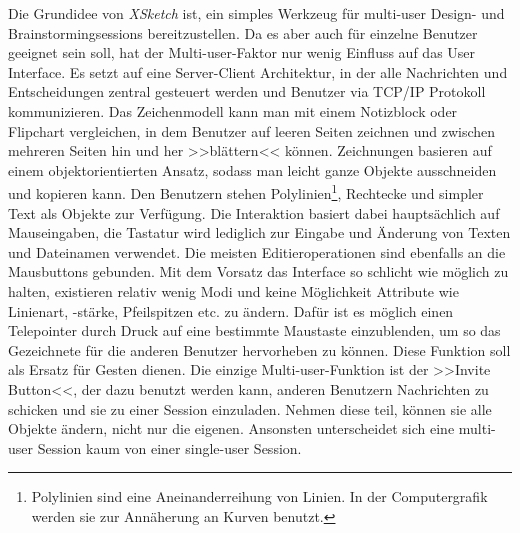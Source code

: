 \medskip Die Grundidee von \emph{XSketch} ist, ein simples Werkzeug für multi-user Design- und Brainstormingsessions bereitzustellen. Da es aber auch für einzelne Benutzer geeignet sein soll, hat der Multi-user-Faktor nur wenig Einfluss auf das User Interface. Es setzt auf eine Server-Client Architektur, in der alle Nachrichten und Entscheidungen zentral gesteuert werden und Benutzer via TCP/IP Protokoll kommunizieren. Das Zeichenmodell kann man mit einem Notizblock oder Flipchart vergleichen, in dem Benutzer auf leeren Seiten zeichnen und zwischen mehreren Seiten hin und her >>blättern<< können. Zeichnungen basieren auf einem objektorientierten Ansatz, sodass man leicht ganze Objekte ausschneiden und kopieren kann. Den Benutzern stehen Polylinien\footnote{Polylinien sind eine Aneinanderreihung von Linien. In der Computergrafik werden sie zur Annäherung an Kurven benutzt.}, Rechtecke und simpler Text als Objekte zur Verfügung. Die Interaktion basiert dabei hauptsächlich auf Mauseingaben, die Tastatur wird lediglich zur Eingabe und Änderung von Texten und Dateinamen verwendet. Die meisten Editieroperationen sind ebenfalls an die Mausbuttons gebunden. Mit dem Vorsatz das Interface so schlicht wie möglich zu halten, existieren relativ wenig Modi und keine Möglichkeit Attribute wie Linienart, -stärke, Pfeilspitzen etc. zu ändern. Dafür ist es möglich einen Telepointer durch Druck auf eine bestimmte Maustaste einzublenden, um so das Gezeichnete für die anderen Benutzer hervorheben zu können. Diese Funktion soll als Ersatz für Gesten dienen.
Die einzige Multi-user-Funktion ist der >>Invite Button<<, der dazu benutzt werden kann, anderen Benutzern Nachrichten zu schicken und sie zu einer Session einzuladen. Nehmen diese teil, können sie alle Objekte ändern, nicht nur die eigenen. Ansonsten unterscheidet sich eine multi-user Session kaum von einer single-user Session.

